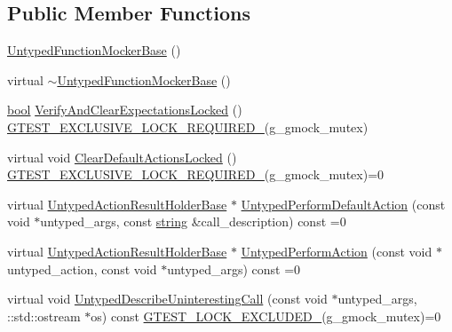 \subsection*{Public Member Functions}
\begin{DoxyCompactItemize}
\item 
\hyperlink{classtesting_1_1internal_1_1UntypedFunctionMockerBase_aedfa95e65d80936e4dff040140513b36}{Untyped\+Function\+Mocker\+Base} ()
\item 
virtual \hyperlink{classtesting_1_1internal_1_1UntypedFunctionMockerBase_a6badd47a3fe2a439ef98aa91bf73d721}{$\sim$\+Untyped\+Function\+Mocker\+Base} ()
\item 
\hyperlink{classbool}{bool} \hyperlink{classtesting_1_1internal_1_1UntypedFunctionMockerBase_a3f1d62a1662a3daa2895b3af963be269}{Verify\+And\+Clear\+Expectations\+Locked} () \hyperlink{gtest-port_8h_a149f693bd59fa1bc937af54c0cdcb32f}{G\+T\+E\+S\+T\+\_\+\+E\+X\+C\+L\+U\+S\+I\+V\+E\+\_\+\+L\+O\+C\+K\+\_\+\+R\+E\+Q\+U\+I\+R\+E\+D\+\_\+}(g\+\_\+gmock\+\_\+mutex)
\item 
virtual void \hyperlink{classtesting_1_1internal_1_1UntypedFunctionMockerBase_a40ddd95736946a7951033aa89a7b617f}{Clear\+Default\+Actions\+Locked} () \hyperlink{gtest-port_8h_a149f693bd59fa1bc937af54c0cdcb32f}{G\+T\+E\+S\+T\+\_\+\+E\+X\+C\+L\+U\+S\+I\+V\+E\+\_\+\+L\+O\+C\+K\+\_\+\+R\+E\+Q\+U\+I\+R\+E\+D\+\_\+}(g\+\_\+gmock\+\_\+mutex)=0
\item 
virtual \hyperlink{classtesting_1_1internal_1_1UntypedActionResultHolderBase}{Untyped\+Action\+Result\+Holder\+Base} $\ast$ \hyperlink{classtesting_1_1internal_1_1UntypedFunctionMockerBase_a2cb149456cd559d5b0615f2310b235e3}{Untyped\+Perform\+Default\+Action} (const void $\ast$untyped\+\_\+args, const \hyperlink{namespacetesting_1_1internal_a8e8ff5b11e64078831112677156cb111}{string} \&call\+\_\+description) const =0
\item 
virtual \hyperlink{classtesting_1_1internal_1_1UntypedActionResultHolderBase}{Untyped\+Action\+Result\+Holder\+Base} $\ast$ \hyperlink{classtesting_1_1internal_1_1UntypedFunctionMockerBase_ada5a72303863d0aa655b66338b8efea5}{Untyped\+Perform\+Action} (const void $\ast$untyped\+\_\+action, const void $\ast$untyped\+\_\+args) const =0
\item 
virtual void \hyperlink{classtesting_1_1internal_1_1UntypedFunctionMockerBase_a48a17fa75b744c2bfb19ee1f54d51759}{Untyped\+Describe\+Uninteresting\+Call} (const void $\ast$untyped\+\_\+args, \+::std\+::ostream $\ast$os) const \hyperlink{gtest-port_8h_a69abff5a4efdd07bd5faebe3dd318d06}{G\+T\+E\+S\+T\+\_\+\+L\+O\+C\+K\+\_\+\+E\+X\+C\+L\+U\+D\+E\+D\+\_\+}(g\+\_\+gmock\+\_\+mutex)=0

\end{DoxyCompactItemize}
